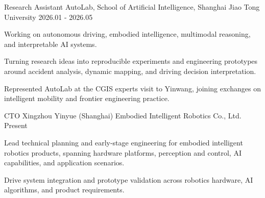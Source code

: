 
\begin{cventries}

  \cventry
    {Research Assistant}
    {AutoLab, School of Artificial Intelligence, Shanghai Jiao Tong University}
    {}
    {2026.01 - 2026.05}
    {
      \begin{cvitems}
        \item {Working on autonomous driving, embodied intelligence, multimodal reasoning, and interpretable AI systems.}
        \item {Turning research ideas into reproducible experiments and engineering prototypes around accident analysis, dynamic mapping, and driving decision interpretation.}
        \item {Represented AutoLab at the CGIS experts visit to Yinwang, joining exchanges on intelligent mobility and frontier engineering practice.}
      \end{cvitems}
    }

\end{cventries}


\begin{cventries}

  \cventry
    {CTO}
    {Xingzhou Yinyue (Shanghai) Embodied Intelligent Robotics Co., Ltd.}
    {}
    {Present}
    {
      \begin{cvitems}
        \item {Lead technical planning and early-stage engineering for embodied intelligent robotics products, spanning hardware platforms, perception and control, AI capabilities, and application scenarios.}
        \item {Drive system integration and prototype validation across robotics hardware, AI algorithms, and product requirements.}
      \end{cvitems}
    }

\end{cventries}


